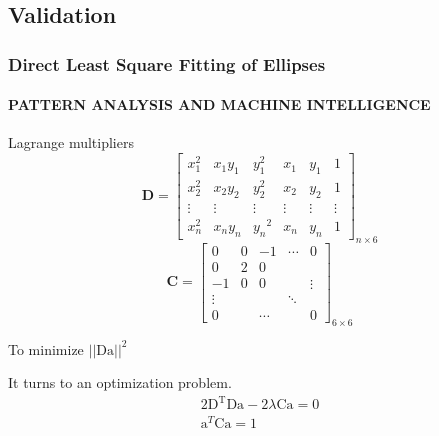 \documentclass[aspectratio=169]{beamer}
\begin{document}
    \subsection{Validation}
    \begin{frame}[allowframebreaks]
        \frametitle{Direct Least Square Fitting of Ellipses}
        \framesubtitle{PATTERN ANALYSIS AND MACHINE INTELLIGENCE}
        Lagrange multipliers
        $$
        \mathbf{D}=\left[\begin{array}{cccccc}
        x_{1}^{2} & x_{1} y_{1} & y_{1}^{2} & x_{1} & y_{1} & 1 \\
        x_{2}^{2} & x_{2} y_{2} & y_{2}^{2} & x_{2} & y_{2} & 1 \\
        \vdots & \vdots & \vdots & \vdots & \vdots & \vdots \\
        x_{n}^{2} & x_{n} y_{n} & y_{n}{ }^{2} & x_{n} & y_{n} & 1
        \end{array}\right]_{n \times 6}
        $$
        $$
        \mathbf{C}=\left[\begin{array}{ccccc}
        0 & 0 & -1 & \cdots & 0 \\
        0 & 2 & 0 & & \\
        -1 & 0 & 0 & & \vdots \\
        \vdots & & & \ddots & \\
        0 & & \cdots & & 0
        \end{array}\right]_{6 \times 6}
        $$

        \framebreak

        To minimize $||\mathrm{D} \mathrm{a}||^2$

        It turns to an optimization problem.
        $$
        \begin{array}{r}
        2 \mathrm{D}^{\mathrm{T}} \mathrm{D} \mathrm{a}-2 \lambda \mathrm{Ca}=0 \\
        \mathrm{a}^{T} \mathrm{Ca}=1
        \end{array}
        $$
    \end{frame}
\end{document}
